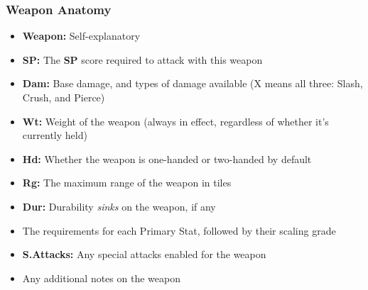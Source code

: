 \documentclass[12pt]{article}
\begin{document}
\subsubsection*{Weapon Anatomy}
\begin{itemize}
\item \textbf{Weapon:} Self-explanatory
\item \textbf{SP:} The \textbf{SP} score required to attack with this weapon
\item \textbf{Dam:} Base damage, and types of damage available (X means all three: Slash, Crush, and Pierce)
\item \textbf{Wt:} Weight of the weapon (always in effect, regardless of whether it’s currently held)
\item \textbf{Hd:} Whether the weapon is one-handed or two-handed by default
\item \textbf{Rg:} The maximum range of the weapon in tiles
\item \textbf{Dur:} Durability \emph{sinks} on the weapon, if any
\item The requirements for each Primary Stat, followed by their scaling grade
\item \textbf{S.Attacks:} Any special attacks enabled for the weapon
\item Any additional notes on the weapon
\end{itemize}
\end{document}
